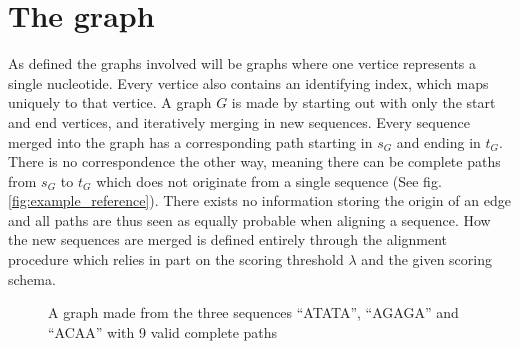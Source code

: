 \documentclass{article}
\begin{document}
\section{The graph}
As defined the graphs involved will be graphs where one vertice represents a single nucleotide. Every vertice also contains an identifying index, which maps uniquely to that vertice. A graph $G$ is made by starting out with only the start and end vertices, and iteratively merging in new sequences. Every sequence merged into the graph has a corresponding path starting in $s_G$ and ending in $t_G$. There is no correspondence the other way, meaning there can be complete paths from $s_G$ to $t_G$ which does not originate from a single sequence (See fig. \ref{fig:example_reference}). There exists no information storing the origin of an edge and all paths are thus seen as equally probable when aligning a sequence. How the new sequences are merged is defined entirely through the alignment procedure which relies in part on the scoring threshold $\lambda$ and the given scoring schema.
\clearpage
\begin{figure}
  \begin{mdframed}
    \begin{center}
    \end{center}
  \end{mdframed}
  \caption{A graph made from the three sequences ``ATATA'', ``AGAGA'' and ``ACAA'' with 9 valid complete paths}
\end{figure}
\end{document}
